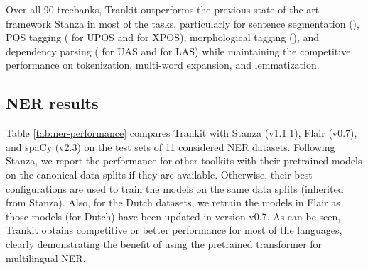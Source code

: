 \documentclass[11pt,a4paper]{article}
\begin{document}
Over all 90 treebanks, Trankit outperforms the previous state-of-the-art framework Stanza in most of the tasks, particularly for sentence segmentation (), POS tagging ( for UPOS and  for XPOS), morphological tagging (), and dependency parsing ( for UAS and  for LAS) while maintaining the competitive performance on tokenization, multi-word expansion, and lemmatization.










\subsection{NER results}

Table \ref{tab:ner-performance} compares Trankit with Stanza (v1.1.1), Flair (v0.7), and spaCy (v2.3) on the test sets of 11 considered NER datasets. Following Stanza, we report the performance for other toolkits with their pretrained models on the canonical data splits if they are available. Otherwise, their best configurations are used to train the models on the same data splits (inherited from Stanza). Also, for the Dutch datasets, we retrain the models in Flair as those models (for Dutch) have been updated in version v0.7. As can be seen, Trankit obtains competitive or better performance for most of the languages, clearly demonstrating the benefit of using the pretrained transformer for multilingual NER.
\end{document}
